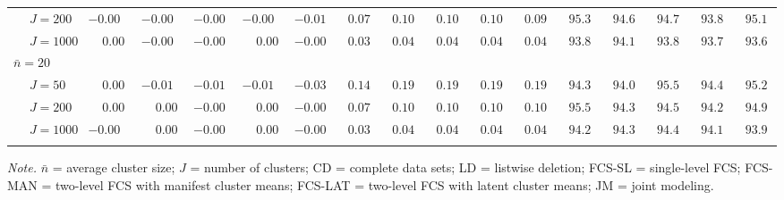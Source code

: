 \begin{sidewaystable}
\begin{threeparttable}
\begin{tabular}{llccccccccccccccc}
 & \nopagebreak $\;J=200$  & ${-}0.00\phantom{0}$ & ${-}0.00\phantom{0}$ & ${-}0.00\phantom{0}$ & ${-}0.00\phantom{0}$ & ${-}0.01\phantom{0}$ & $\phantom{0}0.07\phantom{0}$ & $\phantom{0}0.10\phantom{0}$ & $\phantom{0}0.10\phantom{0}$ & $\phantom{0}0.10\phantom{0}$ & $\phantom{0}0.09\phantom{0}$ & $\phantom{0}95.3\phantom{0}$ & $\phantom{0}94.6\phantom{0}$ & $\phantom{0}94.7\phantom{0}$ & $\phantom{0}93.8\phantom{0}$ & $\phantom{0}95.1\phantom{0}$ \\
 & \nopagebreak $\;J=1000$  & $\phantom{-}0.00\phantom{0}$ & ${-}0.00\phantom{0}$ & ${-}0.00\phantom{0}$ & $\phantom{-}0.00\phantom{0}$ & ${-}0.00\phantom{0}$ & $\phantom{0}0.03\phantom{0}$ & $\phantom{0}0.04\phantom{0}$ & $\phantom{0}0.04\phantom{0}$ & $\phantom{0}0.04\phantom{0}$ & $\phantom{0}0.04\phantom{0}$ & $\phantom{0}93.8\phantom{0}$ & $\phantom{0}94.1\phantom{0}$ & $\phantom{0}93.8\phantom{0}$ & $\phantom{0}93.7\phantom{0}$ & $\phantom{0}93.6\phantom{0}$ \\
\multicolumn{4}{l}{$\bar{n}=20$} \\  & \nopagebreak $\;J=50$  & $\phantom{-}0.00\phantom{0}$ & ${-}0.01\phantom{0}$ & ${-}0.01\phantom{0}$ & ${-}0.01\phantom{0}$ & ${-}0.03\phantom{0}$ & $\phantom{0}0.14\phantom{0}$ & $\phantom{0}0.19\phantom{0}$ & $\phantom{0}0.19\phantom{0}$ & $\phantom{0}0.19\phantom{0}$ & $\phantom{0}0.19\phantom{0}$ & $\phantom{0}94.3\phantom{0}$ & $\phantom{0}94.0\phantom{0}$ & $\phantom{0}95.5\phantom{0}$ & $\phantom{0}94.4\phantom{0}$ & $\phantom{0}95.2\phantom{0}$ \\
 & \nopagebreak $\;J=200$  & $\phantom{-}0.00\phantom{0}$ & $\phantom{-}0.00\phantom{0}$ & ${-}0.00\phantom{0}$ & $\phantom{-}0.00\phantom{0}$ & ${-}0.00\phantom{0}$ & $\phantom{0}0.07\phantom{0}$ & $\phantom{0}0.10\phantom{0}$ & $\phantom{0}0.10\phantom{0}$ & $\phantom{0}0.10\phantom{0}$ & $\phantom{0}0.10\phantom{0}$ & $\phantom{0}95.5\phantom{0}$ & $\phantom{0}94.3\phantom{0}$ & $\phantom{0}94.5\phantom{0}$ & $\phantom{0}94.2\phantom{0}$ & $\phantom{0}94.9\phantom{0}$ \\
 & \nopagebreak $\;J=1000$  & ${-}0.00\phantom{0}$ & $\phantom{-}0.00\phantom{0}$ & ${-}0.00\phantom{0}$ & $\phantom{-}0.00\phantom{0}$ & ${-}0.00\phantom{0}$ & $\phantom{0}0.03\phantom{0}$ & $\phantom{0}0.04\phantom{0}$ & $\phantom{0}0.04\phantom{0}$ & $\phantom{0}0.04\phantom{0}$ & $\phantom{0}0.04\phantom{0}$ & $\phantom{0}94.2\phantom{0}$ & $\phantom{0}94.3\phantom{0}$ & $\phantom{0}94.4\phantom{0}$ & $\phantom{0}94.1\phantom{0}$ & $\phantom{0}93.9\phantom{0}$ \\
[0.5ex]\hline\\[-1.6ex] 
\end{tabular}
\begin{tablenotes}{\footnotesize \textit{Note.} $\bar{n}$ = average cluster size; $J$ = number of clusters; CD = complete data sets; LD = listwise deletion; FCS-SL = single-level FCS; FCS-MAN = two-level FCS with manifest cluster means; FCS-LAT = two-level FCS with latent cluster means; JM = joint modeling.}\end{tablenotes}
\end{threeparttable}
\end{sidewaystable}
